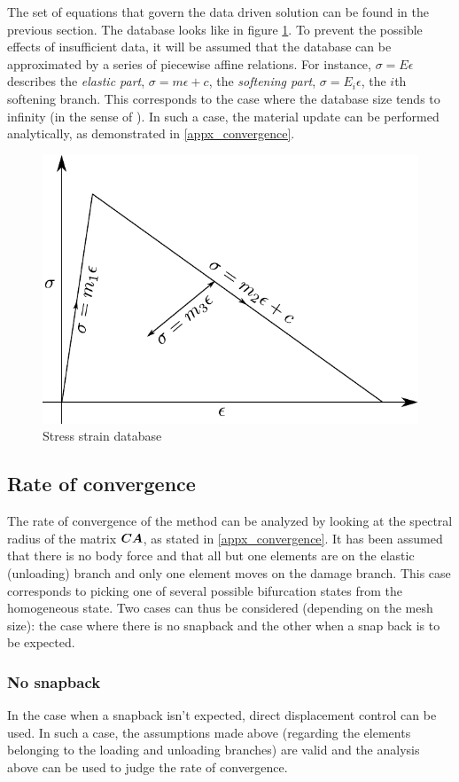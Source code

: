 \documentclass[12pt]{elsarticle}
\begin{document}
The set of equations that govern the data driven solution can be found in the previous section. The database looks like in figure \ref{database_actual}. To prevent the possible effects of insufficient data, it will be assumed that the database can be approximated by a series of piecewise affine relations. For instance, $\sigma=E \epsilon$ describes the \textit{elastic part}, $\sigma = m\epsilon + c$, the \textit{softening part}, $\sigma = E_i \epsilon$, the $i$th softening branch. This corresponds to the case where the database size tends to infinity (in the sense of ). In such a case, the material update can be performed analytically, as demonstrated in \ref{appx_convergence}. 

\begin{figure}
	\centering
	\includegraphics[width=0.4\linewidth]{Images/database_actual.pdf}
	\caption{Stress strain database \label{database_actual}}
\end{figure}

\subsection{Rate of convergence}
The rate of convergence of the method can be analyzed by looking at the spectral radius of the matrix $\mbox{\boldmath $C$} \mbox{\boldmath $A$} $, as stated in \ref{appx_convergence}. It has been assumed that there is no body force and that all but one elements are on the elastic (unloading) branch and only one element moves on the damage branch. This case corresponds to picking one of several possible bifurcation states from the homogeneous state. Two cases can thus be considered (depending on the mesh size): the case where there is no snapback and the other when a snap back is to be expected. 

\subsubsection*{No snapback}
In the case when a snapback isn't expected, direct displacement control can be used. In such a case, the assumptions made above (regarding the elements belonging to the loading and unloading branches) are valid and the analysis above can be used to judge the rate of convergence. 
\end{document}
